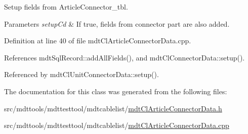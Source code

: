 Setup fields from Article\-Connector\-\_\-tbl. 


\begin{DoxyParams}{Parameters}
{\em setup\-Cd} & If true, fields from connector part are also added. \\
\hline
\end{DoxyParams}


Definition at line 40 of file mdt\-Cl\-Article\-Connector\-Data.\-cpp.



References mdt\-Sql\-Record\-::add\-All\-Fields(), and mdt\-Cl\-Connector\-Data\-::setup().



Referenced by mdt\-Cl\-Unit\-Connector\-Data\-::setup().



The documentation for this class was generated from the following files\-:\begin{DoxyCompactItemize}
\item 
src/mdttools/mdttesttool/mdtcablelist/\hyperlink{mdt_cl_article_connector_data_8h}{mdt\-Cl\-Article\-Connector\-Data.\-h}\item 
src/mdttools/mdttesttool/mdtcablelist/\hyperlink{mdt_cl_article_connector_data_8cpp}{mdt\-Cl\-Article\-Connector\-Data.\-cpp}\end{DoxyCompactItemize}
